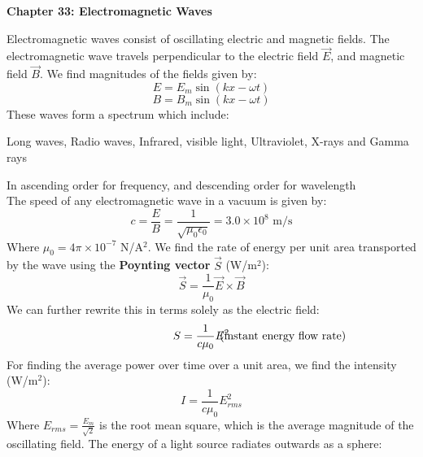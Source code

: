 \documentclass[11pt]{article}
\begin{document}
    \noindent \textbf{Chapter 33: Electromagnetic Waves }%
    \vspace{1em}

    \noindent Electromagnetic waves consist of oscillating electric and magnetic fields.
    The electromagnetic wave travels perpendicular to the electric field $\vec{E} $, and magnetic field $\vec{B} $.
    We find magnitudes of the fields given by:
    \begin{equation}
        E = E_m \sin (kx - \omega t) \tag{electric field}
    \end{equation}
    \begin{equation}
        B = B_m \sin(kx - \omega t) \tag{magnetic field}
    \end{equation}
    \noindent These waves form a spectrum which include:
    \begin{center}
        Long waves, Radio waves, Infrared, visible light, Ultraviolet, X-rays and Gamma rays
    \end{center}
   In ascending order for frequency, and descending order for wavelength
    \\The speed of any electromagnetic wave in a vacuum is given by:
    \begin{equation}
        c = \frac{E}{B} = \frac{1}{\sqrt{\mu_0 \epsilon_0}} = 3.0 \times 10^8 \text{ m/s} \tag{speed of light}
    \end{equation}
    Where $\mu_0 = 4\pi \times 10^{-7}$ N/A$^2$.
    We find the rate of energy per unit area transported by the wave using the \textbf{Poynting vector } $\vec{S}$ (W/m$^2$):
    \begin{equation}
        \vec{S} = \frac{1}{\mu_0} \vec{E} \times \vec{B} \tag{Poynting vector}
    \end{equation}
    We can further rewrite this in terms solely as the electric field:
    \begin{equation}
      \hspace{3cm} S = \frac{1}{c \mu_0} E^2 \hspace{-1cm} \tag{instant energy flow rate}
    \end{equation}
    For finding the average power over time over a unit area, we find the intensity (W/m$^2$):
    \begin{equation}
        I = \frac{1}{c \mu_0} E_{rms}^2 \tag{intensity}
    \end{equation}
    Where $E_{rms} = \frac{E_m}{\sqrt{2}}$ is the root mean square,
    which is the average magnitude of the oscillating field.
    The energy of a light source radiates outwards as a sphere:
\end{document}
